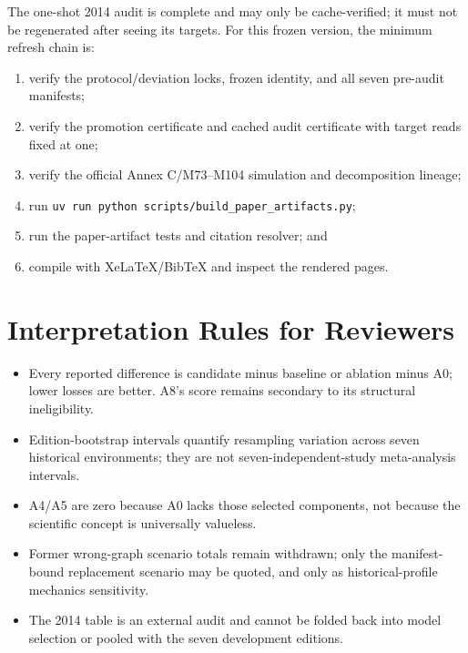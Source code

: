\documentclass[11pt]{article}
\begin{document}
The one-shot 2014 audit is complete and may only be cache-verified; it must not be regenerated after
seeing its targets.  For this frozen version, the minimum refresh chain is:
\begin{enumerate}
  \item verify the protocol/deviation locks, frozen identity, and all seven pre-audit manifests;
  \item verify the promotion certificate and cached audit certificate with target reads fixed at one;
  \item verify the official Annex C/M73--M104 simulation and decomposition lineage;
  \item run \texttt{uv run python scripts/build\_paper\_artifacts.py};
  \item run the paper-artifact tests and citation resolver; and
  \item compile with XeLaTeX/BibTeX and inspect the rendered pages.
\end{enumerate}

\section{Interpretation Rules for Reviewers}

\begin{itemize}
  \item Every reported difference is candidate minus baseline or ablation minus A0; lower losses
  are better.  A8's score remains secondary to its structural ineligibility.
  \item Edition-bootstrap intervals quantify resampling variation across seven historical
  environments; they are not seven-independent-study meta-analysis intervals.
  \item A4/A5 are zero because A0 lacks those selected components, not because the scientific
  concept is universally valueless.
  \item Former wrong-graph scenario totals remain withdrawn; only the manifest-bound replacement
  scenario may be quoted, and only as historical-profile mechanics sensitivity.
  \item The 2014 table is an external audit and cannot be folded back into model selection or pooled
  with the seven development editions.
\end{itemize}
\end{document}
